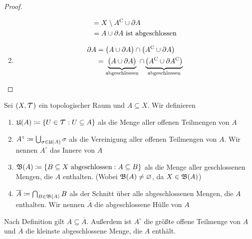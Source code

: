 \begin{satz}
\begin{proof}
\begin{enumerate}[label=(\roman*)]
\begin{align*}
                &= X\setminus {A}^{\mathrm{C}} \cup \partial A\\
                &= A\cup \partial A \text{ ist abgeschlossen }
            \end{align*}
            \item
            \begin{align*}
                \partial A &= \pair{\vphantom{\comp{A}}A\cup \partial A} \cap \pair{\comp{A} \cup \partial A}\\
                &= \underbrace{\pair{\vphantom{\comp{A}}A \cup \partial A}}_{\text{abgeschlossen}} \cap \underbrace{\pair{\comp{A}\cup \partial \comp{A}}}_{\text{abgeschlossen}}\qedhere
            \end{align*}
        \end{enumerate}
    \end{proof}
\end{satz}

\begin{definition}
    Sei $\pair{X, \Tau}$ ein topologischer Raum und $A\subseteq X$. Wir definieren
    \begin{enumerate}[label=(\roman*)]
        \item $\mathfrak{U}\of{A} \coloneqq \set{U\in\Tau: U\subseteq A}$ als die Menge aller offenen Teilmengen von $A$
        \item $A^{\circ} \coloneqq \bigcup_{\sigma\in \mathfrak{U}\of{A}} \sigma$ als die Vereinigung aller offenen Teilmengen von $A$. Wir nennen $A^{\circ}$ das Innere von $A$
        \item $\mathfrak{B}\of{A} \coloneqq \set{B\subseteq X \text{ abgeschlossen}: A \subseteq B}$ als die Menge aller geschlossenen Mengen, die $A$ enthalten. (Wobei $\mathfrak{B}\of{A} \neq \emptyset$, da $X\in \mathfrak{B}\of{A}$)
        \item $\overline{A} \coloneqq \bigcap_{B\in \mathfrak{B}\of{A}} B$ als der Schnitt über alle abgeschlossenen Mengen, die $A$ enthalten. Wir nennen $\overline{A}$ die abgeschlossene Hülle von $A$
    \end{enumerate}
\end{definition}

\begin{bemerkung}
    Nach Definition gilt $A \subseteq \overline{A}$. Außerdem ist $A^{\circ}$ die größte offene Teilmenge von $A$ und $\overline{A}$ die kleinste abgeschlossene Menge, die $A$ enthält.
\end{bemerkung}

